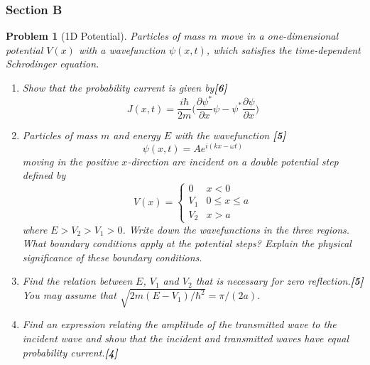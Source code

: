 \documentclass[a4paper]{article}
\theoremstyle{new}
\newtheorem{qns}{Problem}[subsection]
\begin{document}
\subsubsection{Section B}
\begin{qns}[1D Potential]
Particles of mass $m$ move in a one-dimensional potential $V(x)$ with a wavefunction $\psi(x,t)$, which satisfies the time-dependent Schrodinger equation.
\begin{enumerate}[label=(\alph*)]
\item Show that the probability current is given by\hfill\textbf{[6]}
$$J(x,t)=\frac{i\hbar}{2m}\bigg(\frac{\partial\psi^*}{\partial x}\psi-\psi^*\frac{\partial\psi}{\partial x}\bigg)$$
\item Particles of mass $m$ and energy $E$ with the wavefunction \hfill\textbf{[5]}
$$\psi(x,t)=Ae^{i(kx-\omega t)}$$
moving in the positive $x$-direction are incident on a double potential step defined by
$$V(x)=
\left\{
        \begin{array}{ll}
      0 & x<0 \\
      V_1 & 0\leq x\leq a\\
      V_2 & x>a
        \end{array}
    \right.$$
where $E > V_2 > V_1 > 0$. Write down the wavefunctions in the three regions. What boundary conditions apply at the potential steps? Explain the physical significance of these boundary conditions.
\item Find the relation between $E$, $V_1$ and $V_2$ that is necessary for zero reflection.\hfill\textbf{[5]}\\[5pt]
You may assume that $\sqrt{2m(E-V_1)/\hbar^2}=\pi/(2a)$.
\item Find an expression relating the amplitude of the transmitted wave to the incident wave and show that the incident and transmitted waves have equal probability current.\hfill\textbf{[4]}
\end{enumerate}
\end{qns}
\end{document}
